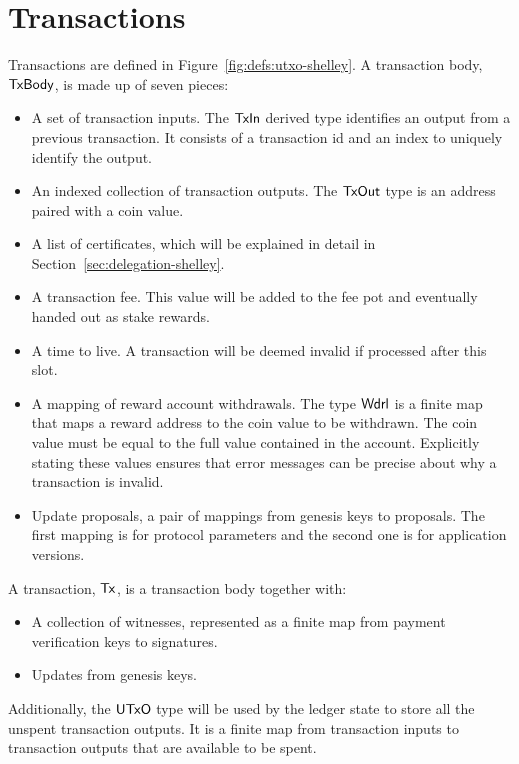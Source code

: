 \section{Transactions}
\label{sec:transactions}

Transactions are defined in Figure~\ref{fig:defs:utxo-shelley}.
A transaction body, $\mathsf{TxBody}$, is made up of seven pieces:

\begin{itemize}
  \item A set of transaction inputs.
    The $\mathsf{TxIn}$ derived type identifies an output from a previous transaction.
    It consists of a transaction id and an index to uniquely identify the output.
  \item An indexed collection of transaction outputs.
    The $\mathsf{TxOut}$ type is an address paired with a coin value.
  \item A list of certificates, which will be explained in detail in
    Section~\ref{sec:delegation-shelley}.
  \item A transaction fee. This value will be added to the fee pot and eventually handed out
    as stake rewards.
  \item A time to live. A transaction will be deemed invalid if processed after this slot.
  \item A mapping of reward account withdrawals.  The type $\mathsf{Wdrl}$ is a finite map that maps
    a reward address to the coin value to be withdrawn. The coin value must be equal
    to the full value contained in the account. Explicitly stating these values ensures
    that error messages can be precise about why a transaction is invalid.
  \item Update proposals, a pair of mappings from genesis keys to proposals.
    The first mapping is for protocol parameters and the second one is for application versions.
\end{itemize}
A transaction, $\mathsf{Tx}$, is a transaction body together with:

\begin{itemize}
  \item A collection of witnesses, represented as a finite map from payment verification keys
    to signatures.
  \item Updates from genesis keys.
\end{itemize}

Additionally, the $\mathsf{UTxO}$ type will be used by the ledger state to store all the
unspent transaction outputs. It is a finite map from transaction inputs
to transaction outputs that are available to be spent.

